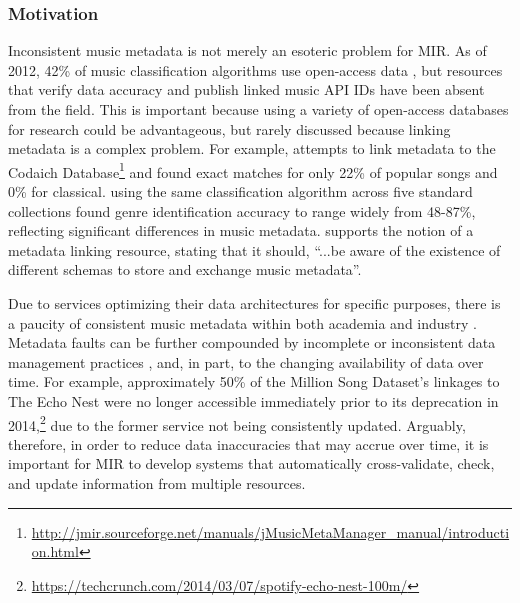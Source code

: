 \documentclass[a4paper]{article}
\begin{document}
\subsubsection{Motivation}
Inconsistent music metadata is not merely an esoteric problem for MIR. As of 2012, 42\% of music classification algorithms use open-access data \cite{sturm2012survey}, but resources that verify data accuracy and publish linked music \Gls{API} IDs have been absent from the field. This is important because using a variety of open-access databases for research could be advantageous, but rarely discussed because linking metadata is a complex problem. For example, \cite{angeles:00} attempts to link metadata to the Codaich Database\footnote{\url{http://jmir.sourceforge.net/manuals/jMusicMetaManager_manual/introduction.html}} and found exact matches for only 22\% of popular songs and 0\% for classical. \cite{bogdanov2016cross} using the same classification algorithm across five standard collections found genre identification accuracy to range widely from 48-87\%, reflecting significant differences in music metadata. \cite{corthaut2008connecting} supports the notion of a metadata linking resource, stating that it should, ``...be aware of the existence of different schemas to store and exchange music metadata''. 

Due to services optimizing their data architectures for specific purposes, there is a paucity of consistent music metadata within both academia and industry \cite{corthaut2008connecting}. Metadata faults can be further compounded by incomplete or inconsistent data management practices \cite{angeles:00}, and, in part, to the changing availability of data over time. For example, approximately 50\% of the Million Song Dataset's \cite{bertin:00} linkages to The Echo Nest were no longer accessible immediately prior to its deprecation in 2014,\footnote{\url{https://techcrunch.com/2014/03/07/spotify-echo-nest-100m/}} due to the former service not being consistently updated. Arguably, therefore, in order to reduce data inaccuracies that may accrue over time, it is important for MIR to develop systems that automatically cross-validate, check, and update information from multiple resources.
\end{document}
